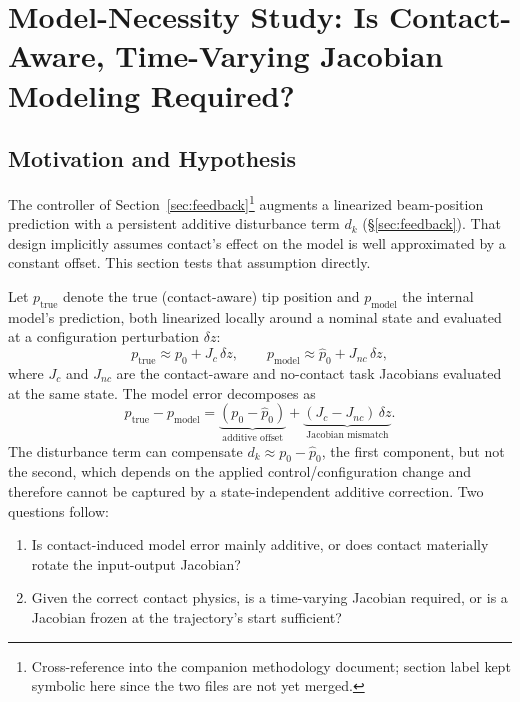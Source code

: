 \documentclass[journal]{IEEEtran}
\begin{document}
\section{Model-Necessity Study: Is Contact-Aware, Time-Varying Jacobian Modeling Required?}
\label{sec:model-necessity}

\subsection{Motivation and Hypothesis}
\label{sec:mn-motivation}

The controller of Section~\ref{sec:feedback}\footnote{Cross-reference
into the companion methodology document; section label kept symbolic
here since the two files are not yet merged.} augments a linearized
beam-position prediction with a persistent additive disturbance term
$d_k$ (\S\ref{sec:feedback}). That design implicitly assumes contact's
effect on the model is well approximated by a constant offset. This
section tests that assumption directly.

Let $p_{\mathrm{true}}$ denote the true (contact-aware) tip position and
$p_{\mathrm{model}}$ the internal model's prediction, both linearized
locally around a nominal state and evaluated at a configuration
perturbation $\delta z$:
\begin{equation}
p_{\mathrm{true}} \approx p_0 + J_c\,\delta z,
\qquad
p_{\mathrm{model}} \approx \hat p_0 + J_{nc}\,\delta z,
\end{equation}
where $J_c$ and $J_{nc}$ are the contact-aware and no-contact task
Jacobians evaluated at the same state. The model error decomposes as
\begin{equation}
p_{\mathrm{true}} - p_{\mathrm{model}}
= \underbrace{(p_0 - \hat p_0)}_{\text{additive offset}}
+ \underbrace{(J_c - J_{nc})\,\delta z}_{\text{Jacobian mismatch}}.
\end{equation}
The disturbance term can compensate $d_k \approx p_0 - \hat p_0$, the
first component, but not the second, which depends on the applied
control/configuration change and therefore cannot be captured by a
state-independent additive correction. Two questions follow:
\begin{enumerate}
\item[Q1.] Is contact-induced model error mainly additive, or does
  contact materially rotate the input-output Jacobian?
\item[Q2.] Given the correct contact physics, is a time-varying
  Jacobian required, or is a Jacobian frozen at the trajectory's start
  sufficient?
\end{enumerate}
\end{document}
